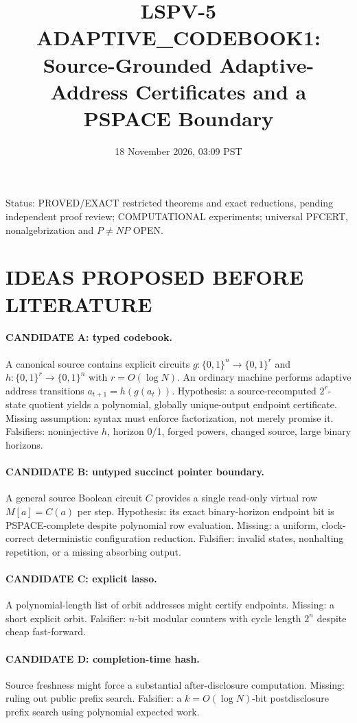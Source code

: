 \documentclass[11pt]{article}
\title{LSPV-5 ADAPTIVE\_CODEBOOK1: Source-Grounded Adaptive-Address Certificates and a PSPACE Boundary}
\date{18 November 2026, 03:09 PST}
\begin{document}
\maketitle
\noindent Status: PROVED/EXACT restricted theorems and exact reductions, pending independent proof review; COMPUTATIONAL experiments; universal PFCERT, nonalgebrization and $P\ne NP$ OPEN.

\section{IDEAS PROPOSED BEFORE LITERATURE}
\paragraph{CANDIDATE A: typed codebook.} A canonical source contains explicit circuits $g:\{0,1\}^n\to\{0,1\}^r$ and $h:\{0,1\}^r\to\{0,1\}^n$ with $r=O(\log N)$. An ordinary machine performs adaptive address transitions $a_{t+1}=h(g(a_t))$. Hypothesis: a source-recomputed $2^r$-state quotient yields a polynomial, globally unique-output endpoint certificate. Missing assumption: syntax must enforce factorization, not merely promise it. Falsifiers: noninjective $h$, horizon 0/1, forged powers, changed source, large binary horizons.
\paragraph{CANDIDATE B: untyped succinct pointer boundary.} A general source Boolean circuit $C$ provides a single read-only virtual row $M[a]=C(a)$ per step. Hypothesis: its exact binary-horizon endpoint bit is PSPACE-complete despite polynomial row evaluation. Missing: a uniform, clock-correct deterministic configuration reduction. Falsifier: invalid states, nonhalting repetition, or a missing absorbing output.
\paragraph{CANDIDATE C: explicit lasso.} A polynomial-length list of orbit addresses might certify endpoints. Missing: a short explicit orbit. Falsifier: $n$-bit modular counters with cycle length $2^n$ despite cheap fast-forward.
\paragraph{CANDIDATE D: completion-time hash.} Source freshness might force a substantial after-disclosure computation. Missing: ruling out public prefix search. Falsifier: a $k=O(\log N)$-bit postdisclosure prefix search using polynomial expected work.
\end{document}
